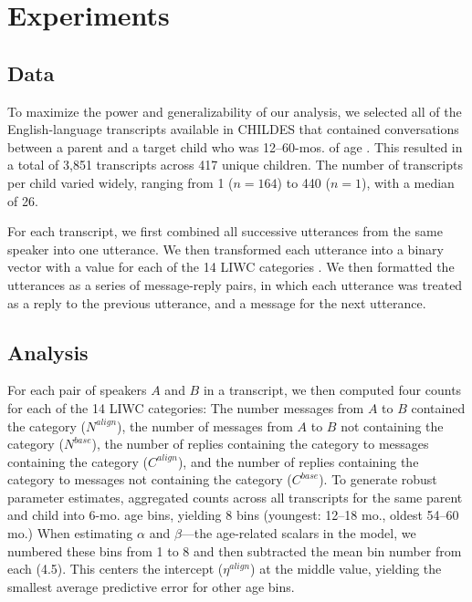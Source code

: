 \documentclass[10pt,letterpaper]{article}
\begin{document}
\section{Experiments}

\subsection{Data}

To maximize the power and generalizability of our analysis, we selected all of the English-language transcripts available in CHILDES that contained conversations between a parent and a target child who was 12--60-mos. of age \cite{macwhinney2000}. This resulted in a total of 3,851 transcripts across 417 unique children. The number of transcripts per child varied widely, ranging from 1 ($n = 164$) to 440 ($n = 1$), with a median of 26. 

For each transcript, we first combined all successive utterances from the same speaker into one utterance. We then transformed each utterance into a binary vector with a value for each of the 14 LIWC categories \cite{pennebaker2007}. We then formatted the utterances as a series of message-reply pairs, in which each utterance was treated as a reply to the previous utterance, and a message for the next utterance.

\subsection{Analysis}

For each pair of speakers $A$ and $B$  in a transcript, we then computed four counts for each of the 14 LIWC categories: The number messages from $A$ to $B$ contained the category ($N^{align}$), the number of messages from $A$ to $B$ not containing the category ($N^{base}$), the number of replies containing the category to messages containing the category ($C^{align}$), and the number of replies containing the category to messages not containing the category ($C^{base}$). To generate robust parameter estimates, aggregated counts across all transcripts for the same parent and child into 6-mo. age bins, yielding 8 bins (youngest: 12--18 mo., oldest 54--60 mo.) When estimating $\alpha$ and $\beta$---the age-related scalars in the model, we numbered these bins from 1 to 8 and then subtracted the mean bin number from each (4.5). This centers the intercept ($\eta^{align}$) at the middle value, yielding the smallest average predictive error for other age bins. 
\end{document}
